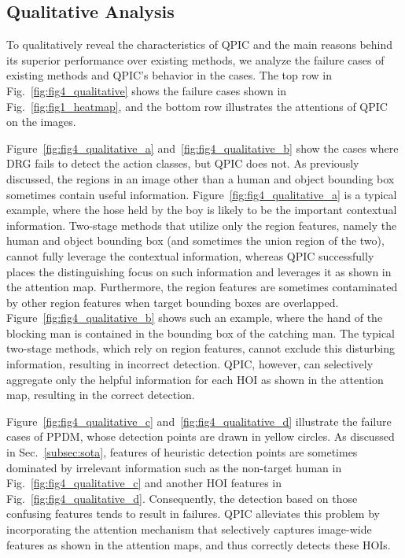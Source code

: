 \documentclass[final]{cvpr}
\begin{document}
\subsection{Qualitative Analysis}\label{sec:quality}
To qualitatively reveal the characteristics of QPIC and the main reasons behind its superior performance over existing methods, we analyze the failure cases of existing methods and QPIC's behavior in the cases.
The top row in Fig.~\ref{fig:fig4_qualitative} shows the failure cases shown in Fig.~\ref{fig:fig1_heatmap}, and the bottom row illustrates the attentions of QPIC on the images.

Figure~\ref{fig:fig4_qualitative_a} and~\ref{fig:fig4_qualitative_b} show the cases where DRG fails to detect the action classes, but QPIC does not. 
As previously discussed, the regions in an image other than a human and object bounding box sometimes contain useful information.
Figure~\ref{fig:fig4_qualitative_a} is a typical example, where the hose held by the boy is likely to be the important contextual information.
Two-stage methods that utilize only the region features, namely the human and object bounding box (and sometimes the union region of the two), cannot fully leverage the contextual information, whereas QPIC successfully places the distinguishing focus on such information and leverages it as shown in the attention map.
Furthermore, the region features are sometimes contaminated by other region features when target bounding boxes are overlapped. 
Figure~\ref{fig:fig4_qualitative_b} shows such an example, where the hand of the blocking man is contained in the bounding box of the catching man.
The typical two-stage methods, which rely on region features, cannot exclude this disturbing information, resulting in incorrect detection.
QPIC, however, can selectively aggregate only the helpful information for each HOI as shown in the attention map, resulting in the correct detection.

Figure~\ref{fig:fig4_qualitative_c} and~\ref{fig:fig4_qualitative_d} illustrate the failure cases of PPDM, whose detection points are drawn in yellow circles. 
As discussed in Sec.~\ref{subsec:sota}, features of heuristic detection points are sometimes dominated by irrelevant information such as the non-target human in Fig.~\ref{fig:fig4_qualitative_c} and another HOI features in Fig.~\ref{fig:fig4_qualitative_d}. 
Consequently, the detection based on those confusing features tends to result in failures.
QPIC alleviates this problem by incorporating the attention mechanism that selectively captures image-wide features as shown in the attention maps, and thus correctly detects these HOIs.
\end{document}
